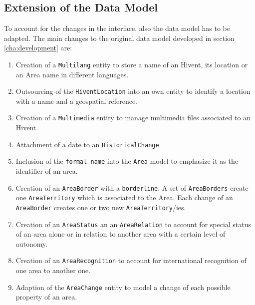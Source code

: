 


\subsection{Extension of the Data Model} %
\label{sub:extension_of_the_data_model}

To account for the changes in the interface, also the data model has to be adapted. The main changes to the original data model developed in section \ref{cha:development} are:

\begin{enumerate}
  \item Creation of a \texttt{Multilang} entity to store a name of an Hivent, its location or an Area name in different languages.
  \item Outsourcing of the \texttt{HiventLocation} into an own entity to identify a location with a name and a geospatial reference.
  \item Creation of a \texttt{Multimedia} entity to manage multimedia files associated to an Hivent.
  \item Attachment of a date to an \texttt{HistoricalChange}.
  \item Inclusion of the \texttt{formal\_name} into the \texttt{Area} model to emphasize it as the identifier of an area.
  \item Creation of an \texttt{AreaBorder} with a \texttt{borderline}. A set of \texttt{AreaBorders} create one \texttt{AreaTerritory} which is associated to the Area. Each change of an \texttt{AreaBorder} creates one or two new \texttt{AreaTerritory}/ies.
  \item Creation of an \texttt{AreaStatus} an an \texttt{AreaRelation} to account for special status of an area alone or in relation to another area with a certain level of autonomy.
  \item Creation of an \texttt{AreaRecognition} to account for international recognition of one area to another one.
  \item Adaption of the \texttt{AreaChange} entity to model a change of each possible property of an area.
\end{enumerate}


